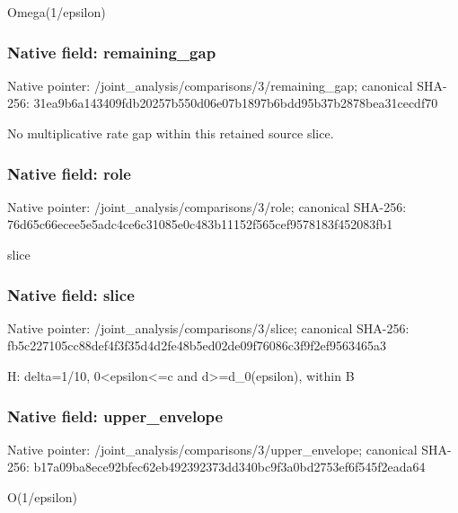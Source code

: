 \documentclass[10pt,a4paper]{article}
\begin{document}
\begingroup\raggedright\sloppy Omega(1/\allowbreak{}epsilon)\par\endgroup

\subsubsection{Native field: remaining\_\allowbreak{}gap}
Native pointer: /joint\_\allowbreak{}analysis/comparisons/3/remaining\_\allowbreak{}gap; canonical SHA-256: 31ea9b6a143409fdb20257b550d06e07b1897b6bdd95b37b2878bea31cecdf70

\begingroup\raggedright\sloppy No multiplicative rate gap within this retained source slice.\par\endgroup

\subsubsection{Native field: role}
Native pointer: /joint\_\allowbreak{}analysis/comparisons/3/role; canonical SHA-256: 76d65c66ecee5e5adc4ce6c31085e0c483b11152f565cef9578183f452083fb1

\begingroup\raggedright\sloppy slice\par\endgroup

\subsubsection{Native field: slice}
Native pointer: /joint\_\allowbreak{}analysis/comparisons/3/slice; canonical SHA-256: fb5c227105cc88def4f3f35d4d2fe48b5ed02de09f76086c3f9f2ef9563465a3

\begingroup\raggedright\sloppy H:\allowbreak{} delta=\allowbreak{}1/\allowbreak{}10,\allowbreak{} 0<epsilon<=\allowbreak{}c and d>=\allowbreak{}d\_\allowbreak{}0(epsilon),\allowbreak{} within B\par\endgroup

\subsubsection{Native field: upper\_\allowbreak{}envelope}
Native pointer: /joint\_\allowbreak{}analysis/comparisons/3/upper\_\allowbreak{}envelope; canonical SHA-256: b17a09ba8ece92bfec62eb492392373dd340bc9f3a0bd2753ef6f545f2eada64

\begingroup\raggedright\sloppy O(1/\allowbreak{}epsilon)\par\endgroup
\end{document}
